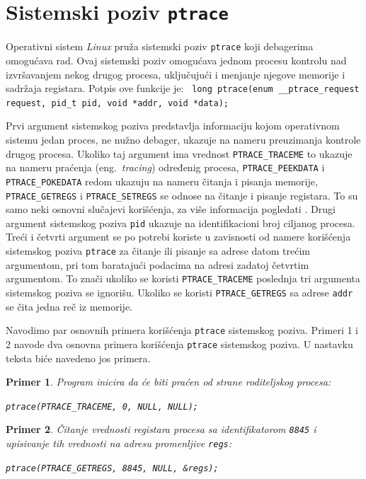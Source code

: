 \documentclass[12pt,oneside]{memoir}
\newtheorem{primer}{Primer}
\begin{document}
\section{Sistemski poziv \texttt{ptrace}}

Operativni sistem \emph{Linux} pruža sistemski poziv \texttt{ptrace} \cite{ptrace} koji debagerima omogućava rad. Ovaj sistemski poziv omogućava jednom procesu kontrolu nad izvršavanjem nekog drugog procesa, uključujući i menjanje njegove memorije i sadržaja registara.
Potpis ove funkcije je:
\newline\newline
\texttt{ long ptrace\newline(enum \_\_ptrace\_request request, pid\_t pid, void *addr, void *data);}
\newline

Prvi argument sistemskog poziva predstavlja informaciju kojom operativnom sistemu jedan proces, ne nužno debager, ukazuje na nameru preuzimanja kontrole drugog procesa. Ukoliko taj argument ima vrednost \texttt{PTRACE\_TRACEME} to ukazuje na nameru praćenja (eng.~\emph{tracing}) određenig procesa, \texttt{PTRACE\_PEEKDATA} i \texttt{PTRACE\_POKEDATA} redom ukazuju na nameru čitanja i pisanja  memorije, \texttt{PTRACE\_GETREGS} i \texttt{PTRACE\_SETREGS} se odnose na čitanje i pisanje registara. To su samo neki osnovni slučajevi korišćenja, za više informacija pogledati \cite{ptrace}. Drugi argument sistemskog poziva \texttt{pid} ukazuje na identifikacioni broj ciljanog procesa. Treći i četvrti argument se po potrebi koriste u zavisnosti od namere korišćenja sistemskog poziva \texttt{ptrace} za čitanje ili pisanje sa adrese datom trećim argumentom, pri tom baratajući podacima na adresi zadatoj četvrtim argumentom. To znači ukoliko se koristi \texttt{PTRACE\_TRACEME} poslednja tri argumenta sistemskog poziva se ignorišu. Ukoliko se koristi \texttt{PTRACE\_GETREGS} sa adrese \texttt{addr} se čita jedna reč iz memorije.

Navodimo par osnovnih primera korišćenja \texttt{ptrace} sistemskog poziva. Primeri 1 i 2 navode dva osnovna primera korišćenja \texttt{ptrace} sistemskog poziva. U nastavku teksta biće navedeno jos primera.

\begin{primer}
Program inicira da će biti praćen od strane roditeljskog procesa:

\texttt{ptrace(PTRACE\_TRACEME, 0, NULL, NULL);}
\end{primer}

\begin{primer}
Čitanje vrednosti registara procesa sa identifikatorom \texttt{8845} i upisivanje tih vrednosti na adresu promenljive \texttt{regs}:

\texttt{ptrace(PTRACE\_GETREGS, 8845, NULL, \&regs);}

\end{primer}
\end{document}
